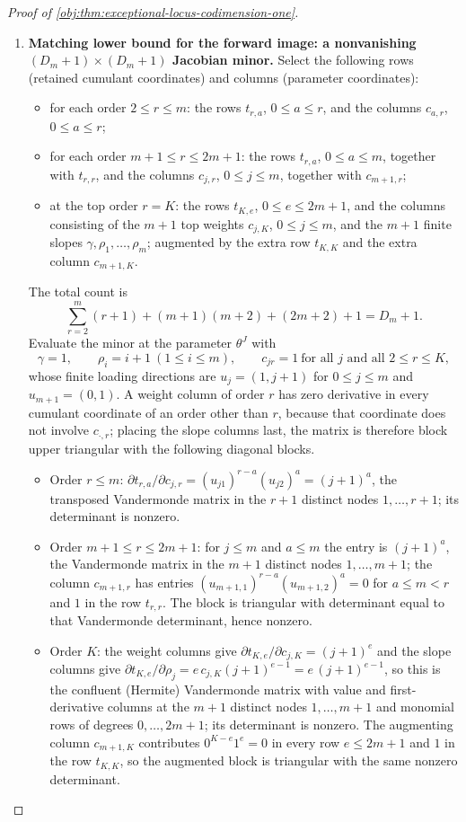 \documentclass[11pt]{article}
\begin{document}
\begin{proof}[Proof of \cref{obj:thm:exceptional-locus-codimension-one}]
\begin{enumerate}
\item \textbf{Matching lower bound for the forward image: a nonvanishing \((D_m+1)\times(D_m+1)\) Jacobian minor.}  Select the following rows (retained cumulant coordinates) and columns (parameter coordinates):
\begin{itemize}
\item for each order \(2\le r\le m\): the rows \(t_{r,a}\), \(0\le a\le r\), and the columns \(c_{a,r}\), \(0\le a\le r\);
\item for each order \(m+1\le r\le 2m+1\): the rows \(t_{r,a}\), \(0\le a\le m\), together with \(t_{r,r}\), and the columns \(c_{j,r}\), \(0\le j\le m\), together with \(c_{m+1,r}\);
\item at the top order \(r=K\): the rows \(t_{K,e}\), \(0\le e\le 2m+1\), and the columns consisting of the \(m+1\) top weights \(c_{j,K}\), \(0\le j\le m\), and the \(m+1\) finite slopes \(\gamma,\rho_1,\ldots,\rho_m\); augmented by the extra row \(t_{K,K}\) and the extra column \(c_{m+1,K}\).
\end{itemize}
The total count is
\[
\sum_{r=2}^{m}(r+1)+(m+1)(m+2)+(2m+2)+1=D_m+1 .
\]
Evaluate the minor at the parameter \(\theta^{J}\) with
\[
\gamma=1,\qquad \rho_i=i+1\ (1\le i\le m),\qquad c_{jr}=1\ \text{for all }j\text{ and all }2\le r\le K,
\]
whose finite loading directions are \(u_j=(1,j+1)\) for \(0\le j\le m\) and \(u_{m+1}=(0,1)\).  A weight column of order \(r\) has zero derivative in every cumulant coordinate of an order other than \(r\), because that coordinate does not involve \(c_{\cdot,r}\); placing the slope columns last, the matrix is therefore block upper triangular with the following diagonal blocks.
\begin{itemize}
\item Order \(r\le m\): \(\partial t_{r,a}/\partial c_{j,r}=(u_{j1})^{r-a}(u_{j2})^{a}=(j+1)^{a}\), the transposed Vandermonde matrix in the \(r+1\) distinct nodes \(1,\ldots,r+1\); its determinant is nonzero.
\item Order \(m+1\le r\le 2m+1\): for \(j\le m\) and \(a\le m\) the entry is \((j+1)^{a}\), the Vandermonde matrix in the \(m+1\) distinct nodes \(1,\ldots,m+1\); the column \(c_{m+1,r}\) has entries \((u_{m+1,1})^{r-a}(u_{m+1,2})^{a}=0\) for \(a\le m<r\) and \(1\) in the row \(t_{r,r}\).  The block is triangular with determinant equal to that Vandermonde determinant, hence nonzero.
\item Order \(K\): the weight columns give \(\partial t_{K,e}/\partial c_{j,K}=(j+1)^{e}\) and the slope columns give \(\partial t_{K,e}/\partial\rho_j=e\,c_{j,K}(j+1)^{e-1}=e\,(j+1)^{e-1}\), so this is the confluent (Hermite) Vandermonde matrix with value and first-derivative columns at the \(m+1\) distinct nodes \(1,\ldots,m+1\) and monomial rows of degrees \(0,\ldots,2m+1\); its determinant is nonzero.  The augmenting column \(c_{m+1,K}\) contributes \(0^{K-e}1^{e}=0\) in every row \(e\le 2m+1\) and \(1\) in the row \(t_{K,K}\), so the augmented block is triangular with the same nonzero determinant.

\end{itemize}
\end{enumerate}
\end{proof}
\end{document}
